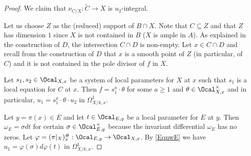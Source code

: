 \begin{proof}
We claim that $\nu_{C/X}:\widetilde{C}\to X$ is $u_2$-integral.


Let us choose $Z$  as the (reduced) support of $B\cap X$. Note that $C\subseteq Z$ and that $Z$ has dimension $1$ since $X$ is not contained in $B$ ($X$ is ample in $A$). As explained in the construction of $D$, the intersection $C\cap D$ is non-empty. Let $x\in C\cap D$ and recall from the construction of $D$ that $x$ is a smooth point of $Z$ (in particular, of $C$) and it is not contained in the pole divisor of $f$ in $X$.



 Let $s_1,s_2\in \Ocal_{X,x}$ be a system of local parameters for $X$ at $x$ such that $s_1$ is a local equation for $C$ at $x$. Then $f=s_1^a\cdot \theta$ for some $a\ge 1$ and $\theta\in \Ocal_{X,x}^\times$ and in particular, $u_1=s_1^a\cdot \theta\cdot u_2$ in $\Omega^1_{X/k,x}$.

Let $y=\pi(x)\in E$ and let $t\in \Ocal_{E,y}$ be a local parameter for $E$ at $y$. Then $\omega_E=\sigma dt$ for certain $\sigma\in \Ocal_{E,y}^\times$ because the invariant differential $\omega_E$ has no zeros. Let $\varphi=(\pi|_X)^\#_x : \Ocal_{E,y}\to \Ocal_{X,x}$. By \eqref{EqnwE} we have $u_1=\varphi(\sigma)d\varphi(t)$ in $\Omega^1_{X/k, x}$.


\end{proof}
